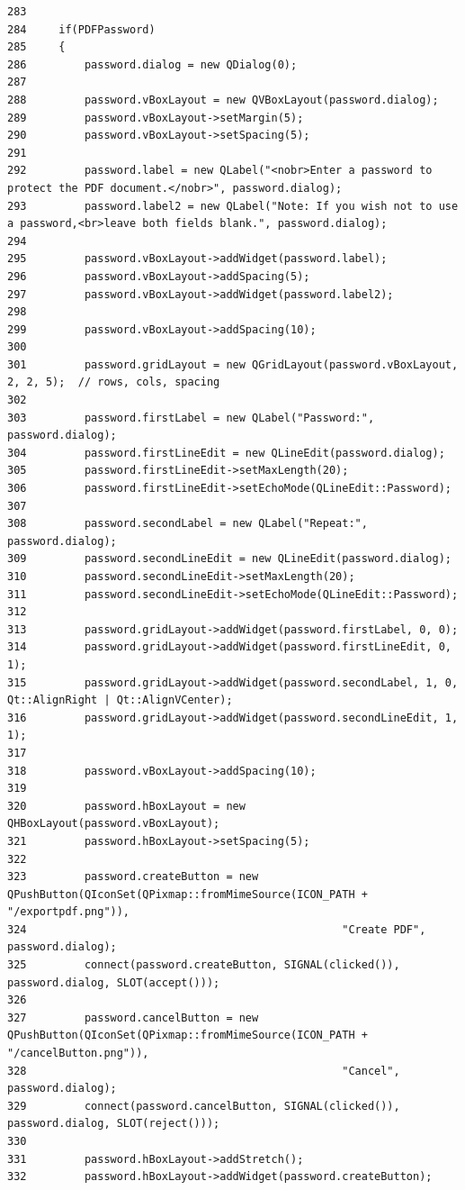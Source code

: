 \begin{verbatim}
283 
284     if(PDFPassword)
285     {
286         password.dialog = new QDialog(0);
287 
288         password.vBoxLayout = new QVBoxLayout(password.dialog);
289         password.vBoxLayout->setMargin(5);
290         password.vBoxLayout->setSpacing(5);
291 
292         password.label = new QLabel("<nobr>Enter a password to protect the PDF document.</nobr>", password.dialog);
293         password.label2 = new QLabel("Note: If you wish not to use a password,<br>leave both fields blank.", password.dialog);
294 
295         password.vBoxLayout->addWidget(password.label);
296         password.vBoxLayout->addSpacing(5);
297         password.vBoxLayout->addWidget(password.label2);
298 
299         password.vBoxLayout->addSpacing(10);
300 
301         password.gridLayout = new QGridLayout(password.vBoxLayout, 2, 2, 5);  // rows, cols, spacing
302 
303         password.firstLabel = new QLabel("Password:", password.dialog);
304         password.firstLineEdit = new QLineEdit(password.dialog);
305         password.firstLineEdit->setMaxLength(20);
306         password.firstLineEdit->setEchoMode(QLineEdit::Password);
307 
308         password.secondLabel = new QLabel("Repeat:", password.dialog);
309         password.secondLineEdit = new QLineEdit(password.dialog);
310         password.secondLineEdit->setMaxLength(20);
311         password.secondLineEdit->setEchoMode(QLineEdit::Password);
312 
313         password.gridLayout->addWidget(password.firstLabel, 0, 0);
314         password.gridLayout->addWidget(password.firstLineEdit, 0, 1);
315         password.gridLayout->addWidget(password.secondLabel, 1, 0, Qt::AlignRight | Qt::AlignVCenter);
316         password.gridLayout->addWidget(password.secondLineEdit, 1, 1);
317 
318         password.vBoxLayout->addSpacing(10);
319 
320         password.hBoxLayout = new QHBoxLayout(password.vBoxLayout);
321         password.hBoxLayout->setSpacing(5);
322 
323         password.createButton = new QPushButton(QIconSet(QPixmap::fromMimeSource(ICON_PATH + "/exportpdf.png")),
324                                                 "Create PDF", password.dialog);
325         connect(password.createButton, SIGNAL(clicked()), password.dialog, SLOT(accept()));
326 
327         password.cancelButton = new QPushButton(QIconSet(QPixmap::fromMimeSource(ICON_PATH + "/cancelButton.png")),
328                                                 "Cancel", password.dialog);
329         connect(password.cancelButton, SIGNAL(clicked()), password.dialog, SLOT(reject()));
330 
331         password.hBoxLayout->addStretch();
332         password.hBoxLayout->addWidget(password.createButton);

\end{verbatim}
